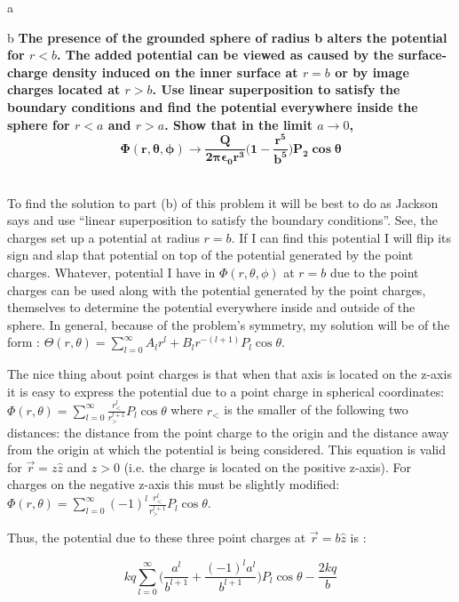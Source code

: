 \begin{homeworkProblem}[Jackson 3rd ed. : 3.7]
\begin{homeworkSection}{a}
\end{homeworkSection}

\begin{homeworkSection}{b}
\textbf{
The presence of the grounded sphere of radius b alters the potential for $r<b$. 
The added potential can be viewed as caused by the surface-charge density 
induced on the inner surface at $r=b$ or by image charges located at $r > b$. 
Use linear superposition to satisfy the boundary conditions and find the potential everywhere inside the sphere for $r < a$ and $r > a$. Show that in the 
limit $a\rightarrow 0$, 
\[
\mathbf{\Phi(r,\theta,\phi) \rightarrow \frac{Q}{2\pi\epsilon_0 r^3}\bigg(1-\frac{r^5}{b^5}\bigg)P_2\cos\theta}
\]
}
\\ \par
To find the solution to part (b) of this problem it will be best to do as Jackson says and use ``linear superposition to satisfy the boundary conditions''. See, the charges set up a potential at radius $r = b$. If I can find this potential I will flip its sign and slap that potential on top of the potential generated by the point charges. Whatever, potential I have in $\Phi(r,\theta,\phi)$ at $r=b$ 
due to the point charges can be used along with the potential generated by the point charges, themselves to determine the potential everywhere inside and outside of the sphere. In general, because of the problem's symmetry, my solution will be of the form : $\Theta(r,\theta) = \sum\limits_{l=0}^{\infty} A_l r^l + B_l r^{-(l+1)} P_l\cos\theta$.
\\ \par
The nice thing about point charges is that when that axis is located on the z-axis it is easy to express the potential due to a point charge in spherical coordinates: $\Phi(r,\theta) = \sum\limits_{l=0}^{\infty} \frac{r_<^l}{r_>^{l+1}} P_l\cos\theta$ where $r_<$ is the smaller of the following two distances: the distance from the point charge to the origin and the distance away from the origin at which the potential is being considered. This equation is valid for $\vec{r} = z \hat{z}$ and $z > 0$ (i.e. the charge is located on the positive z-axis). For charges on the negative z-axis this must be slightly modified: $\Phi(r,\theta) = \sum\limits_{l=0}^{\infty} (-1)^l \frac{r_<^l}{r_>^{l+1}} P_l\cos\theta$.
\\ \par
Thus, the potential due to these three point charges at $\vec{r} = b \hat{z}$ is :

\[
kq \sum\limits_{l=0}^{\infty}\Big(\frac{a^l}{b^{l+1}} + \frac{(-1)^l a^l}{b^{l+1}}\Big) P_l\cos\theta - \frac{2kq}{b}
\]


\end{homeworkSection}
\end{homeworkProblem}
